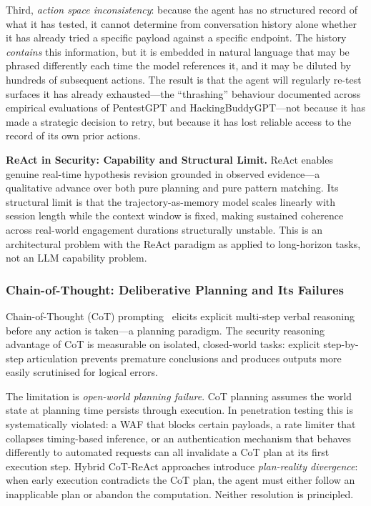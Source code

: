 \documentclass[12pt,a4paper,oneside,openany]{book}
\newcommand{\term}[1]{\textit{#1}}
\begin{document}
Third, \term{action space inconsistency}: because the agent has no structured record of what it has tested, it cannot determine from conversation history alone whether it has already tried a specific payload against a specific endpoint. The history \textit{contains} this information, but it is embedded in natural language that may be phrased differently each time the model references it, and it may be diluted by hundreds of subsequent actions. The result is that the agent will regularly re-test surfaces it has already exhausted---the ``thrashing'' behaviour documented across empirical evaluations of PentestGPT and HackingBuddyGPT---not because it has made a strategic decision to retry, but because it has lost reliable access to the record of its own prior actions.


\noindent\textbf{ReAct in Security: Capability and Structural Limit.} ReAct enables genuine real-time hypothesis revision grounded in observed evidence---a qualitative advance over both pure planning and pure pattern matching. Its structural limit is that the trajectory-as-memory model scales linearly with session length while the context window is fixed, making sustained coherence across real-world engagement durations structurally unstable. This is an architectural problem with the ReAct paradigm as applied to long-horizon tasks, not an LLM capability problem.


\subsubsection{Chain-of-Thought: Deliberative Planning and Its Failures}
\label{subsubsec:cot}

Chain-of-Thought (CoT) prompting~\citep{wei2022cot} elicits explicit multi-step verbal reasoning before any action is taken---a planning paradigm. The security reasoning advantage of CoT is measurable on isolated, closed-world tasks: explicit step-by-step articulation prevents premature conclusions and produces outputs more easily scrutinised for logical errors.

The limitation is \term{open-world planning failure}. CoT planning assumes the world state at planning time persists through execution. In penetration testing this is systematically violated: a WAF that blocks certain payloads, a rate limiter that collapses timing-based inference, or an authentication mechanism that behaves differently to automated requests can all invalidate a CoT plan at its first execution step. Hybrid CoT-ReAct approaches introduce \term{plan-reality divergence}: when early execution contradicts the CoT plan, the agent must either follow an inapplicable plan or abandon the computation. Neither resolution is principled.
\end{document}
